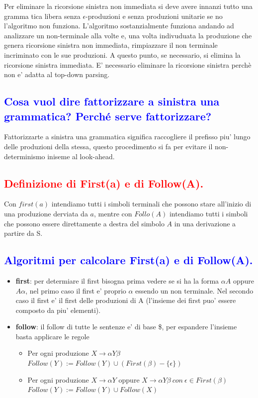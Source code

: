 \documentclass{article}
\begin{document}
Per eliminare la ricorsione sinistra non immediata si deve avere innanzi tutto
una gramma tica libera senza $\epsilon$-produzioni e senza produzioni unitarie
se no l'algoritmo non funziona. L'algoritmo sostanzialmente funziona andando ad
analizzare un non-terminale alla volte e, una volta indivuduata la produzione
che genera ricorsione sinistra non immediata, rimpiazzare il non terminale
incriminato con le sue produzioni. A questo punto, se necessario, si elimina la
ricorsione sinistra immediata. E' necessario eliminare la ricorsione sinistra
perchè non e' adatta al top-down parsing.

\subsection{\textcolor{blue}{Cosa vuol dire fattorizzare a sinistra una grammatica? Perché serve fattorizzare?}}
Fattorizzarte a sinistra una grammatica significa raccogliere il prefisso piu' lungo delle produzioni della stessa, questo procedimento si fa per evitare il non-determinismo iniseme al look-ahead.
\subsection{\textcolor{red}{Definizione di First(a) e di Follow(A).}}
Con $first(a)$ intendiamo tutti i simboli terminali che possono stare all'inizio di una produzione derviata da $a$, mentre con $Follo(A)$ intendiamo tutti i simboli che possono essere direttamente
a destra del simbolo $A$ in una derivazione a partire da S.
\subsection{\textcolor{blue}{Algoritmi per calcolare First(a) e di Follow(A).}}
\begin{itemize}
    \item \textbf{first}: per determiare il first bisogna prima vedere se si ha la forma $\alpha A$ oppure $A\alpha$, nel primo caso il first e' proprio $\alpha$ essendo un non terminale. Nel
          secondo caso il first e' il first delle produzioni di A (l'insieme dei first puo' essere composto da piu' elementi).
    \item \textbf{follow}: il follow di tutte le sentenze e' di base \$, per espandere l'insieme basta applicare le regole \begin{itemize}
              \item Per ogni produzione $X \to \alpha Y\beta$ $Follow(Y) := Follow(Y) \cup
                        (First(\beta) - \{\epsilon\}) $
              \item Per ogni produzione $X \to \alpha Y$ oppure $X \to \alpha Y\beta \ con\
                        \epsilon \in First(\beta)$ $Follow(Y) := Follow(Y) \cup Follow(X) $
          \end{itemize}
\end{itemize}
\end{document}
